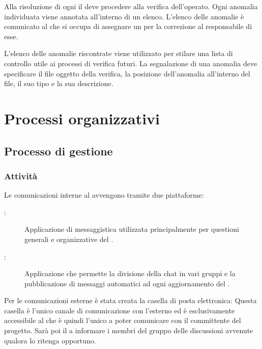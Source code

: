 \documentclass[a4paper, titlepage]{article}
\begin{document}
Alla risoluzione di ogni  il  deve procedere alla verifica dell'operato. Ogni anomalia individuata viene annotata all'interno di un elenco. L'elenco delle anomalie è comunicato al  che si occupa di assegnare un  per la correzione al responsabile di esse.

L'elenco delle anomalie riscontrate viene utilizzato per stilare una lista di controllo utile ai processi di verifica futuri. La segnalazione di una anomalia deve specificare il file oggetto della verifica, la posizione dell'anomalia all'interno del file, il suo tipo e la sua descrizione.


\newpage

\section{Processi organizzativi}

\subsection{Processo di gestione}

\subsubsection{Attività}


Le comunicazioni interne al  avvengono tramite due piattaforme:
\begin{description}
	\item[:] Applicazione di messaggistica utilizzata principalmente per questioni generali e organizzative del .
	\item[:] Applicazione che permette la divisione della chat in vari gruppi e la pubblicazione di messaggi automatici ad ogni aggiornamento del .
\end{description}

Per le comunicazioni esterne è stata creata la casella di posta elettronica:  Questa casella è l'unico canale di comunicazione con l'esterno ed è esclusivamente accessibile al  che è quindi l'unico a poter comunicare con il committente del progetto. Sarà poi il  a informare i membri del gruppo delle discussioni avvenute qualora lo ritenga opportuno.
\end{document}
